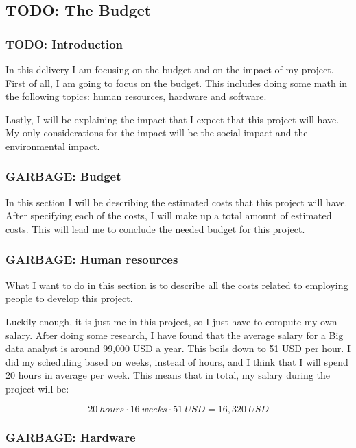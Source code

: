  
\subsection{TODO: The Budget}

\subsubsection{TODO: Introduction}

In this delivery I am focusing on the budget and on the impact of my project.
First of all, I am going to focus on the budget. This includes doing some math
in the following topics: human resources, hardware and software.

Lastly, I will be explaining the impact that I expect that this project will
have. My only considerations for the impact will be the social impact and the
environmental impact.

\subsubsection{GARBAGE: Budget}

In this section I will be describing the estimated costs that this project will
have. After specifying each of the costs, I will make up a total amount of
estimated costs. This will lead me to conclude the needed budget for this
project.

\subsubsection{GARBAGE: Human resources}

What I want to do in this section is to describe all the costs related to
employing people to develop this project.

Luckily enough, it is just me in this project, so I just have to compute my own
salary. After doing some research, I have found that the average salary for a
Big data analyst is around 99,000 USD a year. This boils down to 51 USD per
hour. I did my scheduling based on weeks, instead of hours, and I think that I
will spend 20 hours in average per week. This means that in total, my salary
during the project will be:

\[
  20\ hours \cdot 16\ weeks \cdot 51\ USD = 16,320\ USD
\]


\subsubsection{GARBAGE: Hardware}

